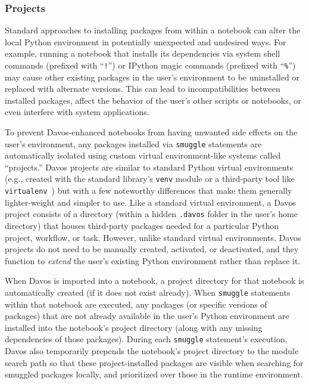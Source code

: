 \documentclass[preprint,12pt,a4paper]{elsarticle}
\begin{document}
\subsubsection{Projects}\label{subsec:projects}

Standard approaches to installing packages from within a notebook can alter the local Python environment in potentially unexpected and undesired ways.
For example, running a notebook that installs its dependencies via system shell commands (prefixed with ``\texttt{!}'') or IPython magic commands (prefixed with ``\texttt{\%}'') may cause other existing packages in the user's environment to be uninstalled or replaced with alternate versions.
This can lead to incompatibilities between installed packages, affect the behavior of the user's other scripts or notebooks, or even interfere with system applications.

To prevent Davos-enhanced notebooks from having unwanted side effects on the user's environment, any packages installed via \texttt{smuggle} statements are automatically isolated using custom virtual environment-like systems called ``projects.''
Davos projects are similar to standard Python virtual environments (e.g., created with the standard library's \texttt{venv} module or a third-party tool like \texttt{virtualenv}~\cite{BickEtal07}) but with a few noteworthy differences that make them generally lighter-weight and simpler to use.
Like a standard virtual environment, a Davos project consists of a directory (within a hidden \texttt{.davos} folder in the user's home directory) that houses third-party packages needed for a particular Python project, workflow, or task.
However, unlike standard virtual environments, Davos projects do not need to be manually created, activated, or deactivated, and they function to \textit{extend} the user's existing Python environment rather than replace it.

When Davos is imported into a notebook, a project directory for that notebook is automatically created (if it does not exist already).
When \texttt{smuggle} statements within that notebook are executed, any packages (or specific versions of packages) that are not already available in the user's Python environment are installed into the notebook's project directory (along with any missing dependencies of those packages).
During each \texttt{smuggle} statement's execution, Davos also temporarily prepends the notebook's project directory to the module search path so that these project-installed packages are visible when searching for smuggled packages locally, and prioritized over those in the runtime environment.
\end{document}
